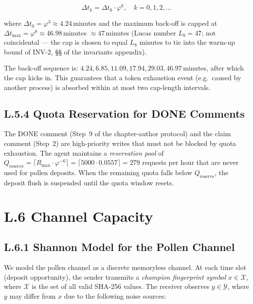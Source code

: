 \begin{equation}
  \Delta t_{k} = \Delta t_{0} \cdot \varphi^{k}, \quad k = 0, 1, 2, \ldots
  \label{eq:backoff}
\end{equation}

where $\Delta t_{0} = \varphi^{3} \approx 4.24$\,minutes and the
maximum back-off is capped at $\Delta t_{\max} = \varphi^{8} \approx
46.98$\,minutes $\approx 47$\,minutes (Lucas number $L_8 = 47$; not
coincidental — the cap is chosen to equal $L_8$ minutes to tie into the
warm-up bound of INV-2, §§ of the invariants appendix).

The back-off sequence is:
$4.24, 6.85, 11.09, 17.94, 29.03, 46.97$\,minutes, after which the
cap kicks in.  This guarantees that a token exhaustion event
(e.g.\ caused by another process) is absorbed within at most two
cap-length intervals.

\subsection*{L.5.4 \quad Quota Reservation for DONE Comments}

The DONE comment (Step~9 of the chapter-author protocol) and the claim
comment (Step~2) are high-priority writes that must not be blocked by
quota exhaustion.  The agent maintains a \emph{reservation pool} of
$Q_{\text{reserve}} = \lceil R_{\max} \cdot \varphi^{-6} \rceil
= \lceil 5000 \cdot 0.0557 \rceil = 279$ requests per hour that are
never used for pollen deposits.  When the remaining quota falls below
$Q_{\text{reserve}}$, the deposit flush is suspended until the quota
window resets.

\section*{L.6 \quad Channel Capacity}
\label{sec:appl-capacity}

\subsection*{L.6.1 \quad Shannon Model for the Pollen Channel}

We model the pollen channel as a discrete memoryless channel.  At each
time slot (deposit opportunity), the sender transmits a
\emph{champion fingerprint symbol} $x \in \mathcal{X}$, where
$\mathcal{X}$ is the set of all valid SHA-256 values.  The receiver
observes $y \in \mathcal{Y}$, where $y$ may differ from $x$ due to
the following noise sources:

